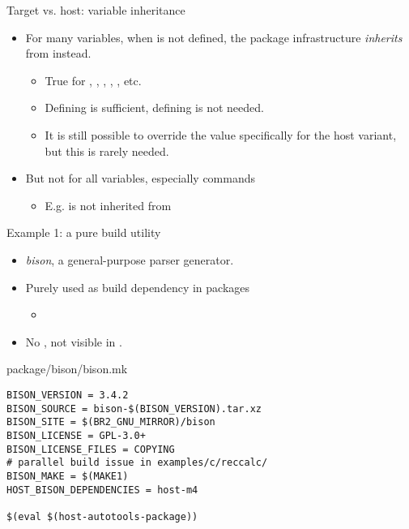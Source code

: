 \begin{frame}{Target vs. host: variable inheritance}
  \begin{itemize}
  \item For many variables, when  is not defined,
    the package infrastructure {\em inherits} from 
    instead.
    \begin{itemize}
    \item True for , ,
      , ,
      , etc.
    \item Defining  is sufficient, defining
       is not needed.
    \item It is still possible to override the value specifically for
      the host variant, but this is rarely needed.
    \end{itemize}
  \item But not for all variables, especially commands
    \begin{itemize}
    \item E.g.  is not inherited
      from 
    \end{itemize}
  \end{itemize}
\end{frame}

\begin{frame}[fragile]{Example 1: a pure build utility}
  \begin{itemize}
  \item {\em bison}, a general-purpose parser generator.
  \item Purely used as build dependency in packages
    \begin{itemize}
    \item {}
    \end{itemize}
  \item No , not visible in .
  \end{itemize}
  \begin{block}{package/bison/bison.mk}
\begin{verbatim}
BISON_VERSION = 3.4.2
BISON_SOURCE = bison-$(BISON_VERSION).tar.xz
BISON_SITE = $(BR2_GNU_MIRROR)/bison
BISON_LICENSE = GPL-3.0+
BISON_LICENSE_FILES = COPYING
# parallel build issue in examples/c/reccalc/
BISON_MAKE = $(MAKE1)
HOST_BISON_DEPENDENCIES = host-m4

$(eval $(host-autotools-package))
\end{verbatim}
  \end{block}
\end{frame}

